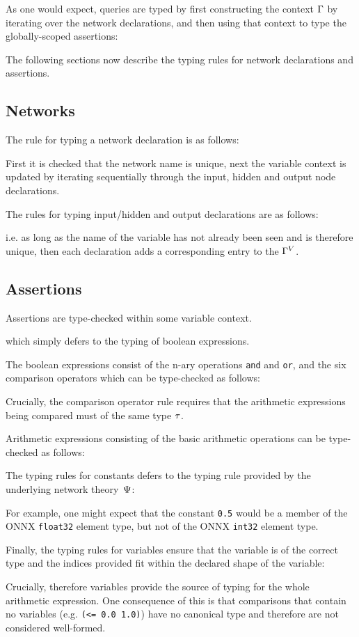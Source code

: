 As one would expect, queries are typed  by first constructing the context $\Gamma$ by iterating over the network declarations, and then using that context to type the globally-scoped assertions:

The following sections now describe the typing rules for network declarations and assertions.

\subsection{Networks}

The rule for typing a network declaration is as follows:

First it is checked that the network name is unique, next the variable context is updated by iterating sequentially through the input, hidden and output node declarations. 

The rules for typing input/hidden and output declarations are as follows:

i.e. as long as the name of the variable has not already been seen and is therefore unique, then each declaration  adds a corresponding entry to the $\Gamma^V$.

\subsection{Assertions}

Assertions are type-checked within some variable context.

which simply defers to the typing of boolean expressions.

The boolean expressions consist of the n-ary operations \texttt{and} and \texttt{or}, and the six comparison operators which can be type-checked as follows:

Crucially, the comparison operator rule requires that the arithmetic expressions being compared must of the same type $\tau$.

Arithmetic expressions consisting of the basic arithmetic operations can be type-checked as follows:

The typing rules for constants defers to the typing rule provided by the underlying network theory~$\Psi$:

For example, one might expect that the constant \texttt{0.5} would be a member of the ONNX \texttt{float32} element type, but not of the ONNX \texttt{int32} element type.

Finally, the typing rules for variables ensure that the variable is of the correct type and the indices provided fit within the declared shape of the variable:

Crucially, therefore variables provide the source of typing for the whole arithmetic expression. 
One consequence of this is that comparisons that contain no variables (e.g. \texttt{(<= 0.0 1.0)}) have no canonical type and therefore are not considered well-formed.

